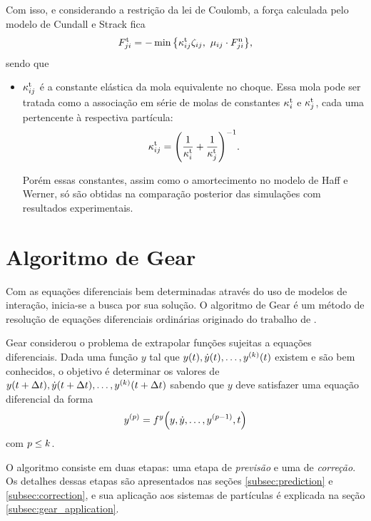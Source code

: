 Com isso, e considerando a restrição da lei de Coulomb, a força calculada pelo modelo de Cundall e Strack fica
\begin{equation*}
	\tangentialForceScalarji = - \min\Bqty{\tangentialElasticConstantij\elongationij,\,\, \dynamicFrictionij\cdot\normalForceScalarji},
\end{equation*}
sendo que
\begin{itemize}
	\item \({\kappa}_{i j}^{\text{t}}\) é a constante elástica da mola equivalente no choque. Essa mola pode ser tratada como a associação em série de molas de constantes \({\kappa}_{i}^{\text{t}}\) e \({\kappa}_{j}^{\text{t}}\), cada uma pertencente à respectiva partícula:
	\begin{equation*}
		\tangentialElasticConstantij = \pqty{\dfrac{1}{\tangentialElasticConstanti} + \dfrac{1}{\tangentialElasticConstantj}}^{-1}.
	\end{equation*}

	Porém essas constantes, assim como o amortecimento no modelo de Haff e Werner, só são obtidas na comparação posterior das simulações com resultados experimentais.
\end{itemize}

\section{Algoritmo de Gear} \label{sec:gear_integration_scheme}

Com as equações diferenciais bem determinadas através do uso de modelos de interação, inicia-se a busca por sua solução. O algoritmo de Gear é um método de resolução de equações diferenciais ordinárias originado do trabalho de .

Gear considerou o problema de extrapolar funções sujeitas a equações diferenciais. Dada uma função \(y\) tal que \(y(t), \deriv{1}{y}(t),\dots, \deriv{\taylorOrder}{y}(t)\) existem e são bem conhecidos, o objetivo é determinar os valores de \(y(t + \Dt), \deriv{1}{y}(t + \Dt),\dots, \deriv{\taylorOrder}{y}(t + \Dt)\) sabendo que \(y\) deve satisfazer uma equação diferencial da forma
\begin{equation} \label{eq:gear_diff}
	\deriv{\eqOrder}{y} = \eqFor{y}\pqty{y, \deriv{1}{y},\dots,\deriv{\eqOrder-1}{y}, t}
\end{equation}
com \(p \leq k\).

O algoritmo consiste em duas etapas: uma etapa de \textit{previsão} e uma de \textit{correção}. Os detalhes dessas etapas são apresentados nas seções \ref{subsec:prediction} e \ref{subsec:correction}, e sua aplicação aos sistemas de partículas é explicada na seção \ref{subsec:gear_application}.


